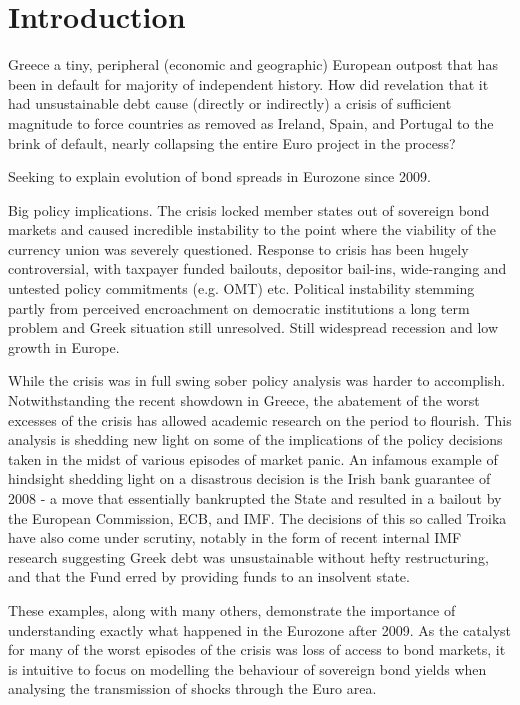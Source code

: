 \documentclass[/../base.tex]{subfiles}
\begin{document}
\section{Introduction}

Greece a tiny, peripheral (economic and geographic) European outpost that has been in default for majority of independent history. \cite{kalyvas2015modern} How did revelation that it had unsustainable debt cause (directly or indirectly) a crisis of sufficient magnitude to force countries as removed as Ireland, Spain, and Portugal to the brink of default, nearly collapsing the entire Euro project in the process? 

Seeking to explain evolution of bond spreads in Eurozone since 2009.

Big policy implications. The crisis locked member states out of sovereign bond markets and caused incredible instability to the point where the viability of the currency union was severely questioned. Response to crisis has been hugely controversial, with taxpayer funded bailouts, depositor bail-ins, wide-ranging and untested policy commitments (e.g. OMT) etc. Political instability stemming partly from perceived encroachment on democratic institutions a long term problem and Greek situation still unresolved. Still widespread recession and low growth in Europe.  

While the crisis was in full swing sober policy analysis was harder to accomplish. Notwithstanding the recent showdown in Greece, the abatement of the worst excesses of the crisis has allowed academic research on the period to flourish. This analysis is shedding new light on some of the implications of the policy decisions taken in the midst of various episodes of market panic. An infamous example of hindsight shedding light on a disastrous decision is the Irish bank guarantee of 2008 - a move that essentially bankrupted the State and resulted in a bailout by the European Commission, ECB, and IMF. The decisions of this so called Troika have also come under scrutiny, notably in the form of recent internal IMF research suggesting Greek debt was unsustainable without hefty restructuring, and that the Fund erred by providing funds to an insolvent state. 

These examples, along with many others, demonstrate the importance of understanding exactly what happened in the Eurozone after 2009. As the catalyst for many of the worst episodes of the crisis was loss of access to bond markets, it is intuitive to focus on modelling the behaviour of sovereign bond yields when analysing the transmission of shocks through the Euro area. 
\end{document}
